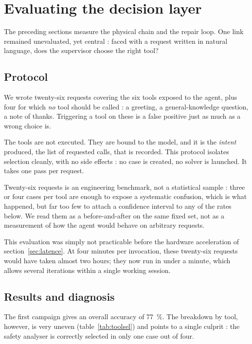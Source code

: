 \section{Evaluating the decision layer}
\label{sec:toolselection}

The preceding sections measure the physical chain and the repair loop. One link
remained unevaluated, yet central : faced with a request written in natural
language, does the supervisor choose the right tool?

\subsection{Protocol}

We wrote twenty-six requests covering the six tools exposed to the agent, plus
four for which \emph{no} tool should be called : a greeting, a general-knowledge
question, a note of thanks. Triggering a tool on these is a
false positive just as much as a wrong choice is.

The tools are not executed. They are bound to the model, and it is the
\emph{intent} produced, the list of requested calls, that is recorded. This
protocol isolates selection cleanly, with no side effects : no case is created,
no solver is launched. It takes one pass per request.

Twenty-six requests is an engineering benchmark, not a statistical sample :
three or four cases per tool are enough to expose a systematic confusion, which
is what happened, but far too few to attach a confidence interval to any of the
rates below. We read them as a before-and-after on the same fixed set, not as a
measurement of how the agent would behave on arbitrary requests.

This evaluation was simply not practicable before the hardware acceleration of
section~\ref{sec:latence}. At four minutes
per invocation, these twenty-six requests would have taken almost two hours;
they now run in under a minute, which allows several iterations within a single
working session.

\subsection{Results and diagnosis}

The first campaign gives an overall accuracy of \SI{77}{\percent}. The
breakdown by tool, however, is very uneven (table~\ref{tab:toolsel}) and points
to a single culprit : the safety analyser is correctly selected in only one case
out of four.

